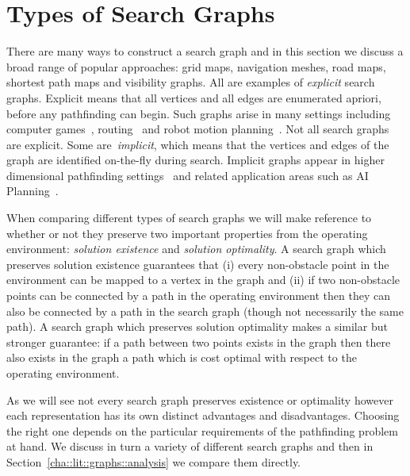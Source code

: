 \section{Types of Search Graphs}
\label{cha::lit::graphs}


There are many ways to construct a search graph and in this section we discuss 
a broad range of popular approaches: grid maps, navigation meshes, road
maps, shortest path maps and visibility graphs.  All are examples of
\emph{explicit} search graphs.  Explicit means that all vertices and all edges
are enumerated apriori, before any pathfinding can begin.  Such graphs arise in
many settings including computer games~\citep{davis00,tozour02,champandard09},
routing~\citep{sanders05,goldberg06} and robot motion
planning~\citep{latombe91,choset05}.  Not all search graphs are explicit.  Some
are~\emph{implicit}, which means that the vertices and edges of the graph are
identified on-the-fly during search.  Implicit graphs appear in higher
dimensional pathfinding settings~\citep{lavalle98,bohlin00} and related
application areas such as AI Planning~\citep{russel03}.

When comparing different types of search graphs we will make reference to
whether or not they preserve two important properties from the operating
environment: \emph{solution existence} and \emph{solution optimality}.  A search
graph which preserves solution existence guarantees that (i) every non-obstacle
point in the environment can be mapped to a vertex in the graph and (ii) if two
non-obstacle points can be connected by a path in the operating environment then
they can also be connected by a path in the search graph (though not necessarily
the same path).  A search graph which preserves solution optimality makes a similar 
but stronger guarantee: if a path between two points exists in the graph then there
also exists in the graph a path which is cost optimal with respect to the
operating environment.


As we will see not every search graph preserves existence or optimality however
each representation has its own distinct advantages and disadvantages. Choosing the
right one depends on the particular requirements of the pathfinding problem at
hand. We discuss in turn a variety of different search graphs and then in
Section~\ref{cha::lit::graphs::analysis} we compare them directly.

